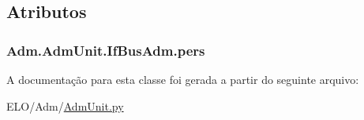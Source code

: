\subsection{Atributos}
\hypertarget{classAdm_1_1AdmUnit_1_1IfBusAdm_a95ea8f39fbbcddf44822e1614c712bfe}{
\subsubsection[{pers}]{\setlength{\rightskip}{0pt plus 5cm}Adm.\-Adm\-Unit.\-If\-Bus\-Adm.\-pers}}\label{d3/d53/classAdm_1_1AdmUnit_1_1IfBusAdm_a95ea8f39fbbcddf44822e1614c712bfe}


A documentação para esta classe foi gerada a partir do seguinte arquivo\-:\begin{DoxyCompactItemize}
\item 
E\-L\-O/\-Adm/\hyperlink{AdmUnit_8py}{Adm\-Unit.\-py}\end{DoxyCompactItemize}
